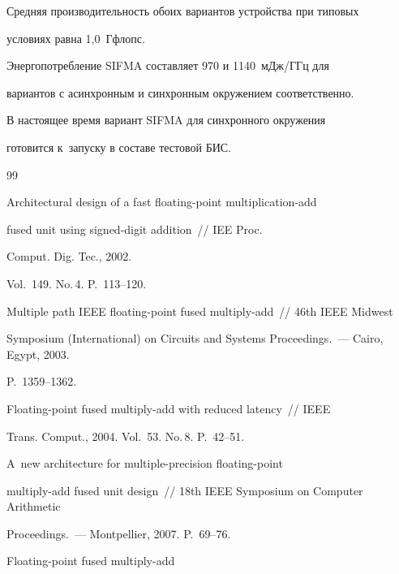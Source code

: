       Средняя производительность обоих вариантов устройства при типовых

условиях равна 1,0~Гфлопс.



      Энергопотребление SIFMA составляет 970 и 1140~мДж/ГГц для

вариантов с асинхронным и синхронным окружением соответственно.



      В настоящее время вариант SIFMA для синхронного окружения

готовится к~запуску в составе тестовой БИС.



{\small\frenchspacing

{%


\begin{thebibliography}{99}


 Architectural design of a fast floating-point multiplication-add

fused unit using signed-digit addition~/\!\!/ IEE Proc.

Comput. Dig. Tec., 2002.

Vol.~149. No.\,4. P.~113--120.


 Multiple path IEEE floating-point fused multiply-add~/\!\!/ 46th IEEE Midwest

Symposium (International) on Circuits and Systems Proceedings.~--- Cairo, Egypt, 2003.

P.~1359--1362.


 Floating-point fused multiply-add with reduced latency~/\!\!/ IEEE

Trans. Comput., 2004. Vol.~53. No.\,8. P.~42--51.


 A~new architecture for multiple-precision floating-point

multiply-add fused unit design~/\!\!/ 18th IEEE Symposium on Computer Arithmetic

Proceedings.~--- Montpellier, 2007. P.~69--76.


 Floating-point fused multiply-add


\end{thebibliography}}}
